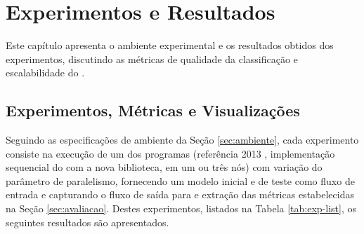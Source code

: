


% 
% 

\chapter{Experimentos e Resultados}\label{cha:results}

Este capítulo apresenta o ambiente experimental e os resultados obtidos dos
experimentos, discutindo as métricas de qualidade da classificação e
escalabilidade do \mfog.


% 

\section{Experimentos, Métricas e Visualizações}
\label{sec:experiments}

\newcommand{\expA}{\textit{a-Referência}\xspace}
\newcommand{\expB}{\textit{b-Sequencial}\xspace}
\newcommand{\expC}{\textit{c-Paralelo}\xspace}
\newcommand{\expD}{\textit{d-Distribuído}\xspace}

Seguindo as especificações de ambiente da Seção \ref{sec:ambiente}, cada
experimento consiste na execução de um dos programas (\minas referência 2013
\cite{Faria2013source}, implementação sequencial do \minas com a nova
biblioteca, \mfog em um ou três nós) com variação do parâmetro de paralelismo,
fornecendo um modelo inicial e \dataset de teste como fluxo de entrada e
capturando o fluxo de saída para e extração das métricas estabelecidas na Seção
\ref{sec:avaliacao}.
Destes experimentos, listados na Tabela \ref{tab:exp-list}, os seguintes
resultados são apresentados.

